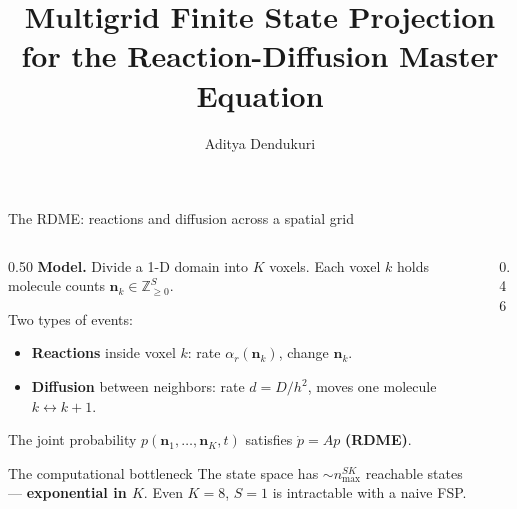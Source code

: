 \documentclass[10pt,aspectratio=169]{beamer}
\title[Multigrid FSP for RDME]{%
  Multigrid Finite State Projection\\
  for the Reaction-Diffusion Master Equation}
\author{Aditya Dendukuri}
\institute[UCSB]{University of California, Santa Barbara}
\date{}
\begin{document}
\begin{frame}\titlepage\end{frame}


\begin{frame}{The RDME: reactions and diffusion across a spatial grid}

  \begin{columns}[T]
    \begin{column}{0.50\textwidth}
      \textbf{Model.}
      Divide a 1-D domain into $K$ voxels.
      Each voxel $k$ holds molecule counts $\mathbf{n}_k \in \mathbb{Z}_{\geq 0}^S$.

      \medskip
      Two types of events:
      \begin{itemize}\setlength\itemsep{0.4em}
        \item \textcolor{slowred}{\textbf{Reactions}} inside voxel $k$:
              rate $\alpha_r(\mathbf{n}_k)$, change $\mathbf{n}_k$.
        \item \textcolor{fastblue}{\textbf{Diffusion}} between neighbors:
              rate $d = D/h^2$, moves one molecule $k \leftrightarrow k{+}1$.
      \end{itemize}

      \medskip
      The joint probability $p(\mathbf{n}_1,\ldots,\mathbf{n}_K,t)$
      satisfies $\dot p = A p$ \textbf{(RDME)}.

      \medskip
      \begin{alertblock}{The computational bottleneck}
        The state space has $\sim n_{\max}^{SK}$ reachable states —
        \textbf{exponential in $K$}.
        Even $K{=}8$, $S{=}1$ is intractable with a naive FSP.
      \end{alertblock}
    \end{column}
    \begin{column}{0.46\textwidth}
      \begin{center}
      \end{center}
    \end{column}
  \end{columns}


\end{frame}
\end{document}
